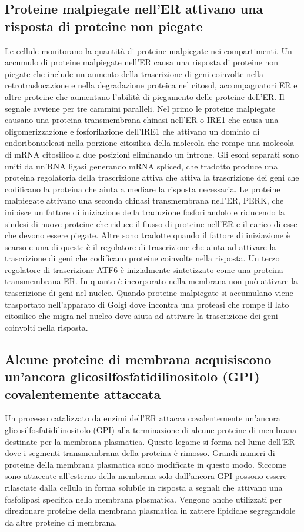 \subsection{Proteine malpiegate nell'ER attivano una risposta di proteine non piegate}
Le cellule monitorano la quantit\`a di proteine malpiegate nei compartimenti. Un accumulo di proteine malpiegate nell'ER causa una risposta di proteine non piegate che include un 
aumento della trascrizione di geni coinvolte nella retrotraslocazione e nella degradazione proteica nel citosol, accompagnatori ER e altre proteine che aumentano l'abilit\`a di 
piegamento delle proteine dell'ER. Il segnale avviene per tre cammini paralleli. Nel primo le proteine malpiegate causano una proteina transmembrana chinasi nell'ER o IRE1 che 
causa una oligomerizzazione e fosforilazione dell'IRE1 che attivano un dominio di endoribonucleasi nella porzione citosilica della molecola che rompe una molecola di mRNA citosilico
a due posizioni eliminando un introne. Gli esoni separati sono uniti da un'RNA ligasi generando mRNA spliced, che tradotto produce una proteina regolatoria della trascrizione attiva
che attiva la trascrizione dei geni che codificano la proteina che aiuta a mediare la risposta necessaria. Le proteine malpiegate attivano una seconda chinasi transmembrana nell'ER, 
PERK, che inibisce un fattore di iniziazione della traduzione fosforilandolo e riducendo la sindesi di nuove proteine che riduce il flusso di proteine nell'ER e il carico di esse che
devono essere piegate. Altre sono tradotte quando il fattore di iniziazione \`e scarso e una di queste \`e il regolatore di trascrizione che aiuta ad attivare la trascrizione di geni
che codificano proteine coinvolte nella risposta. Un terzo regolatore di trascrizione ATF6  \`e inizialmente sintetizzato come una proteina transmembrana ER. In quanto \`e incorporato
nella membrana non pu\`o attivare la trascrizione di geni nel nucleo. Quando proteine malpiegate si accumulano viene trasportato nell'apparato di Golgi dove incontra una proteasi che
rompe il lato citosilico che migra nel nucleo dove aiuta ad attivare la trascrizione dei geni coinvolti nella risposta. 
\subsection{Alcune proteine di membrana acquisiscono un'ancora glicosilfosfatidilinositolo (GPI) covalentemente attaccata}
Un processo catalizzato da enzimi dell'ER attacca covalentemente un'ancora glicosilfosfatidilinositolo (GPI) alla terminazione  di alcune proteine di membrana destinate per la 
membrana plasmatica. Questo legame si forma nel lume dell'ER dove i segmenti transmembrana della proteina \`e rimosso. Grandi numeri di proteine della membrana plasmatica sono 
modificate in questo modo. Siccome sono attaccate all'esterno della membrana solo dall'ancora GPI possono essere rilasciate dalla cellula in forma solubile in risposta a segnali che
attivano una fosfolipasi specifica nella membrana plasmatica. Vengono anche utilizzati per direzionare proteine della membrana plasmatica in zattere lipidiche segregandole da
altre proteine di membrana.
